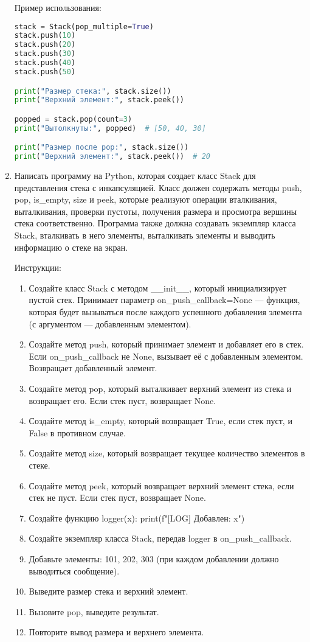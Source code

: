 \begin{enumerate}
Пример использования:
\begin{lstlisting}[language=Python]
stack = Stack(pop_multiple=True)
stack.push(10)
stack.push(20)
stack.push(30)
stack.push(40)
stack.push(50)

print("Размер стека:", stack.size())
print("Верхний элемент:", stack.peek())

popped = stack.pop(count=3)
print("Вытолкнуты:", popped)  # [50, 40, 30]

print("Размер после pop:", stack.size())
print("Верхний элемент:", stack.peek())  # 20
\end{lstlisting}

\item Написать программу на Python, которая создает класс Stack для представления стека с инкапсуляцией. Класс должен содержать методы push, pop, is\_empty, size и peek, которые реализуют операции вталкивания, выталкивания, проверки пустоты, получения размера и просмотра вершины стека соответственно. Программа также должна создавать экземпляр класса Stack, вталкивать в него элементы, выталкивать элементы и выводить информацию о стеке на экран.

Инструкции:
\begin{enumerate}
    \item Создайте класс Stack с методом \_\_init\_\_, который инициализирует пустой стек. Принимает параметр on\_push\_callback=None — функция, которая будет вызываться после каждого успешного добавления элемента (с аргументом — добавленным элементом).
    \item Создайте метод push, который принимает элемент и добавляет его в стек. Если on\_push\_callback не None, вызывает её с добавленным элементом. Возвращает добавленный элемент.
    \item Создайте метод pop, который выталкивает верхний элемент из стека и возвращает его. Если стек пуст, возвращает None.
    \item Создайте метод is\_empty, который возвращает True, если стек пуст, и False в противном случае.
    \item Создайте метод size, который возвращает текущее количество элементов в стеке.
    \item Создайте метод peek, который возвращает верхний элемент стека, если стек не пуст. Если стек пуст, возвращает None.
    \item Создайте функцию logger(x): print(f"[LOG] Добавлен: {x}")
    \item Создайте экземпляр класса Stack, передав logger в on\_push\_callback.
    \item Добавьте элементы: 101, 202, 303 (при каждом добавлении должно выводиться сообщение).
    \item Выведите размер стека и верхний элемент.
    \item Вызовите pop, выведите результат.
    \item Повторите вывод размера и верхнего элемента.
\end{enumerate}


\end{enumerate}
